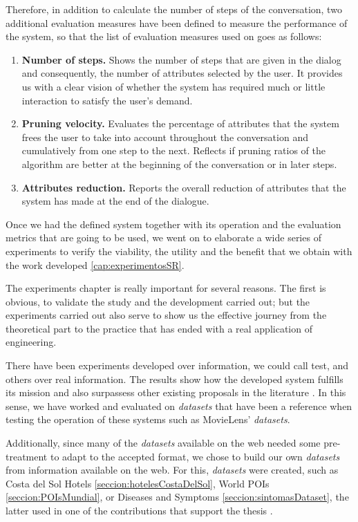 Therefore, in addition to calculate the number of steps of the conversation, two additional evaluation measures have been defined to measure the performance of the system, so that the list of evaluation measures used on \rse goes as follows:
\begin{enumerate}
	\item \textbf{Number of steps.} Shows the number of steps that are given in the dialog and consequently, the number of attributes selected by the user. It provides us with a clear vision of whether the system has required much or little interaction to satisfy the user's demand.
	\item \textbf{Pruning velocity.} Evaluates the percentage of attributes that the system frees the user to take into account throughout the conversation and cumulatively from one step to the next. Reflects if pruning ratios of the algorithm are better at the beginning of the conversation or in later steps.
	\item \textbf{Attributes reduction.} Reports the overall reduction of attributes that the system has made at the end of the dialogue.
\end{enumerate}

Once we had the defined system together with its operation and the evaluation metrics that are going to be used, we went on to elaborate a wide series of experiments to verify the viability, the utility and the benefit that we obtain with the work developed \ref{cap:experimentosSR}.

The experiments chapter is really important for several reasons. The first is obvious, to validate the study and the development carried out; but the experiments carried out also serve to show us the effective journey from the theoretical part to the practice that has ended with a real application of engineering.

There have been experiments developed over information, we could call test, and others over real information. The results show how the developed system fulfills its mission and also surpassess other existing proposals in the literature \cite{TrabelsiWBR11}. In this sense, we have worked and evaluated \rse on \textit{datasets} that have been a reference when testing the operation of these systems such as MovieLens' \textit{datasets}.


Additionally, since many of the \textit{datasets} available on the web needed some pre-treatment to adapt to the accepted \rs format, we chose to build our own \textit{datasets} from information available on the web. For this, \textit{datasets} were created, such as Costa del Sol Hotels \ref{seccion:hotelesCostaDelSol}, World POIs \ref{seccion:POIsMundial}, or Diseases and Symptoms \ref{seccion:sintomasDataset}, the latter used in one of the contributions that support the thesis \cite{Benito-Picazo2017}.

